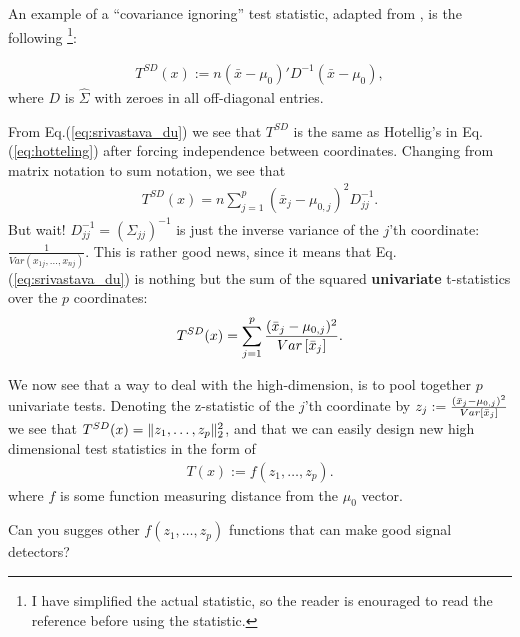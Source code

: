 An example of a ``covariance ignoring'' test statistic, adapted from \cite{srivastava_test_2008}, is the following \footnote{I have simplified the actual statistic, so the reader is enouraged to read the reference before using the statistic.}:
\begin{definition}
\begin{align}
\label{eq:srivastava_du}
	 	T^{SD}(x) := n (\bar{x}-\mu_0)' D^{-1} (\bar{x}-\mu_0),
\end{align}
where $D$ is $\hat{\Sigma}$ with zeroes in all off-diagonal entries. 
\end{definition}
From Eq.(\ref{eq:srivastava_du}) we see that $T^{SD}$ is the same as Hotellig's \tsq in Eq.(\ref{eq:hotteling}) after forcing independence between coordinates.
Changing from matrix notation to sum notation, we see that 
\begin{align}
	 	T^{SD}(x) = n \sum_{j=1}^p (\bar{x}_j - \mu_{0,j})^2 D^{-1}_{jj} .
\end{align}
But wait! 
$D^{-1}_{jj}=(\Sigma_{jj})^{-1}$ is just the inverse variance of the $j$'th coordinate: $\frac{1}{Var(x_{1j},\dots,x_{nj})}$.
This is rather good news, since it means that Eq.(\ref{eq:srivastava_du}) is nothing but the sum of the squared \textbf{univariate} t-statistics over the $p$ coordinates:
\begin{align}
	 	T^{SD}(x) =  \sum_{j=1}^p \frac{(\bar{x}_j - \mu_{0,j})^2}{\mathop{Var} \left[ \bar{x}_j \right]}  .
\end{align}

We now see that a way to deal with the high-dimension, is to pool together $p$ univariate tests.
Denoting the z-statistic of the $j$'th coordinate by $z_j:= \frac{(\bar{x}_j - \mu_{0,j})^2}{\mathop{Var} \left[ \bar{x}_j \right]}$ we see that 
$T^{SD}(x)= \Vert z_1,\dots,z_p \Vert_2^2$, and that we can easily design new high dimensional test statistics in the form of
\begin{align}
\label{eq:marginal_test}
	 	T(x) :=  f(z_1,\dots,z_p) .
\end{align}
where $f$ is some function measuring distance from the $\mu_0$ vector.


\begin{think}
Can you sugges other $f(z_1,\dots,z_p)$ functions that can make good signal detectors?
\end{think}



